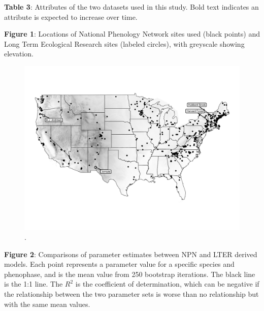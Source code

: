 \documentclass[fleqn,12pt,lineno]{article}
\begin{document}
\textbf{Table 3}: Attributes of the two datasets used in this study. Bold text indicates an attribute is expected to increase over time.



\newpage

\textbf{Figure 1}: Locations of National Phenology Network sites used (black points) and Long Term Ecological Research sites (labeled circles), with greyscale showing elevation.

\newpage

\begin{figure}[H]
	\centering
	\includegraphics[scale=0.6, angle=90]{figure_site_map.png}
	\caption{.}
\end{figure}


\newpage

\textbf{Figure 2}: Comparisons of parameter estimates between NPN and LTER derived models. Each point represents a parameter value for a specific species and phenophase, and is the mean value from 250 bootstrap iterations. The black line is the 1:1 line. The $R^2$ is the coefficient of determination, which can be negative if the relationship between the two parameter sets is worse than no relationship but with the same mean values.

\newpage
\end{document}
